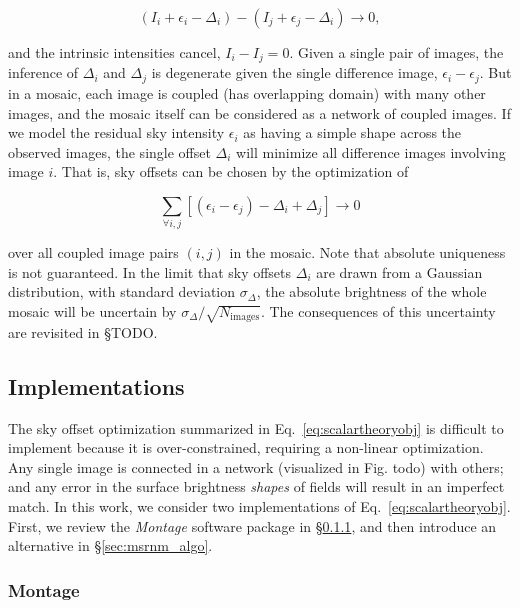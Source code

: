 \documentclass[iop]{emulateapj}
\newcommand{\sw}[1]{\textit{#1}} %
\newcommand{\todo}[1]{\textcolor{RedOrange}{#1}} %
\newcommand{\Eq}[1]{Eq.~\ref{eq:#1}}  %
\newcommand{\Sec}[1]{\S\ref{sec:#1}}  %
\begin{document}
\begin{equation}
    (I_i + \epsilon_i - \Delta_i) - (I_j + \epsilon_j - \Delta_i) \rightarrow 0,
\end{equation}

\noindent and the intrinsic intensities cancel, $I_i - I_j = 0$.
Given a single pair of images, the inference of $\Delta_i$ and $\Delta_j$ is degenerate given the single difference image, $\epsilon_i-\epsilon_j$.
But in a mosaic, each image is coupled (has overlapping domain) with many other images, and the mosaic itself can be considered as a network of coupled images.
If we model the residual sky intensity $\epsilon_i$ as having a simple shape across the observed images, the single offset $\Delta_i$ will minimize all difference images involving image $i$.
That is, sky offsets can be chosen by the optimization of

\begin{equation}
    \sum_{\forall i,j} [(\epsilon_i - \epsilon_j) - \Delta_i + \Delta_j] \rightarrow 0
    \label{eq:scalartheoryobj}
\end{equation}

\noindent over all coupled image pairs $(i,j)$ in the mosaic.
Note that absolute uniqueness is not guaranteed.
In the limit that sky offsets $\Delta_i$ are drawn from a Gaussian distribution, with standard deviation $\sigma_\Delta$, the absolute brightness of the whole mosaic will be uncertain by $\sigma_\Delta / \sqrt{N_\mathrm{images}}$.
The consequences of this uncertainty are revisited in \S\todo{TODO}.

\subsection{Implementations}
\label{sec:offset_algos}

The sky offset optimization summarized in \Eq{scalartheoryobj} is difficult to implement because it is over-constrained, requiring a non-linear optimization.
Any single image is connected in a network (visualized in Fig. \todo{todo}) with others; and any error in the surface brightness \emph{shapes} of fields will result in an imperfect match.
In this work, we consider two implementations of \Eq{scalartheoryobj}.
First, we review the \sw{Montage} software package in \Sec{montage_algo}, and then introduce an alternative in \Sec{msrnm_algo}.

\subsubsection{Montage}
\label{sec:montage_algo}
\end{document}
